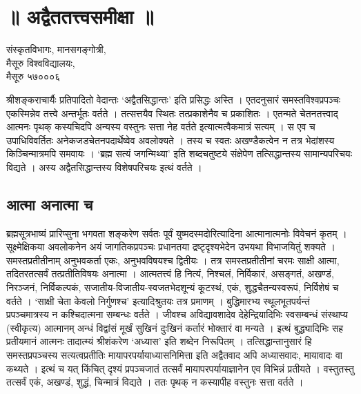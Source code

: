 \chapter{॥ अद्वैततत्त्वसमीक्षा ॥}

\begin{center}
\smallskip
संस्कृतविभागः, मानसगङ्गोत्री,\\
मैसूरु विश्वविद्यालयः,\\
मैसूरु ५७०००६
\end{center}
श्रीशङ्कराचार्यैः प्रतिपादितो वेदान्तः ‘अद्वैतसिद्धान्तः’ इति प्रसिद्धः अस्ति । एतदनुसारं समस्तविश्वप्रपञ्चः एकस्मिन्नेव तत्त्वे अन्तर्भूतः वर्तते । तत्सत्तयैव स्थितः तत्प्रकाशेनैव च प्रकाशितः । एतन्मते चेतनतत्त्वाद् आत्मनः पृथक् कस्यचिदपि अन्यस्य वस्तुनः सत्ता नेह वर्तते इत्यात्मत्वैकमात्रं सत्यम् । स एव च उपाधिविवर्तितः अनेकजडचेतनपदार्थेष्वेव अवलोक्यते । तस्य च स्वतः अखण्डैकत्वेन न तत्र भेदांशस्य किञ्चिन्मात्रमपि समवायः । ‘ब्रह्म सत्यं जगन्मिथ्या’ इति शब्दचतुष्टये संक्षेपेण तत्सिद्धान्तस्य सामान्यपरिचयः विद्यते । अस्य अद्वैतसिद्धान्तस्य विशेषपरिचयः इत्थं वर्तते ।

\section*{आत्मा अनात्मा च}

ब्रह्मसूत्रभाष्यं प्रारिप्सुना भगवता शङ्करेण सर्वतः पूर्वं युष्मदस्मदोरित्यादिना आत्मानात्मनोः विवेचनं कृतम् । सूक्ष्मेक्षिकया अवलोकनेन अयं जागतिकप्रपञ्चः प्रधानतया द्रष्टृदृश्यभेदेन उभयथा विभाजयितुं शक्यते । समस्तप्रतीतीनाम् अनुभवकर्ता एकः, अनुभवविषयश्च द्वितीयः । तत्र समस्तप्रतीतीनां चरमः साक्षी आत्मा, तदितरतत्सर्वं तत्प्रतीतिविषयः अनात्मा । आत्मतत्त्वं हि नित्यं, निश्चलं, निर्विकारं, असङ्गतं, अखण्डं, निरञ्जनं, निर्विकल्पकं, सजातीय-विजातीय-स्वजतभेदशून्यं कूटस्थं, एकं, शुद्धचैतन्यस्वरूपं, निर्विशेषं च वर्तते । ‘साक्षी चेता केवलो निर्गुणश्च’ इत्यादिश्रुतयः तत्र प्रमाणम् । बुद्धिमारभ्य स्थूलभूतपर्यन्तं प्रपञ्चमात्रस्य न कश्चिदात्मना सम्बन्धः वर्तते । जीवश्च अविद्यावशादेव देहेन्द्रियादिभिः स्वसम्बन्धं संस्थाप्य (स्वीकृत्य) आत्मानम् अन्धं विद्वांसं मूर्खं सुखिनं दुःखिनं कर्तारं भोक्तारं वा मन्यते । इत्थं बुद्ध्यादिभिः सह प्रतीयमानं आत्मनः तादात्म्यं श्रीशंकरेण ‘अध्यास’ इति शब्देन निरूपितम् । तत्सिद्धान्तानुसारं हि समस्तप्रपञ्चस्य सत्यत्वप्रतीतिः मायापरपर्यायाध्यासनिमित्ता इति अद्वैतवाद अपि अध्यासवादः, मायावादः वा कथ्यते । इत्थं च यत् किंचित् दृश्यं प्रपञ्चजातं तत्सर्वं मायापरपर्यायाज्ञानेन एव विभिन्नं प्रतीयते । वस्तुतस्तु तत्सर्वं एकं, अखण्डं, शुद्धं, चिन्मात्रं विद्यते । ततः पृथक् न कस्यापीह वस्तुनः सत्ता वर्तते ।

